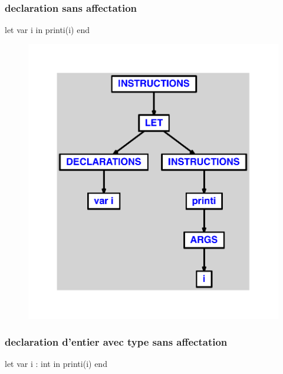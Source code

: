 \documentclass{article}
\begin{document}
\subsubsection{declaration sans affectation}
\begin{verbatimtab}
let
	var i
in
	printi(i)
end
\end{verbatimtab}
\begin{figure}[H]\centering\includegraphics[max width=\textwidth]{ast/ast_279.pdf}\end{figure}\subsubsection{declaration d'entier avec type sans affectation}
\begin{verbatimtab}
let
	var i : int
in
	printi(i)
end
\end{verbatimtab}
\end{document}
